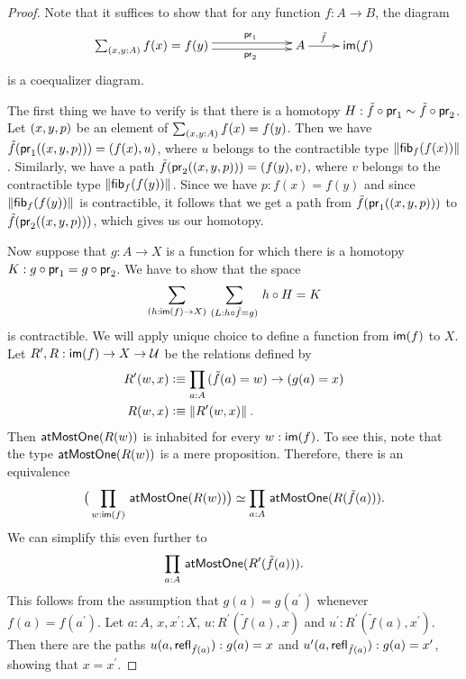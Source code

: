 \begin{proof}
Note that it suffices to show that for any function $f:A\to B$, the diagram
\begin{equation*}
  \xymatrix{
    **[l]{\sm{x,y:A} f(x)= f(y)}
    \ar@<0.25em>[r]^{\proj1}
    \ar@<-0.25em>[r]_{\proj2}
    &
    {A}
    \ar[r]^(0.4){\tilde{f}}
    &
    {\im(f)}
  }
\end{equation*}
is a coequalizer diagram.

The first thing we have to verify is that there is a homotopy 
$H:\tilde{f}\circ\mathsf{pr}_{1}\sim\tilde{f}\circ\mathsf{pr}_{2}$. Let ${(x,y,p)}$ be an element
of $\sm{x,y:A} f(x)= f(y)$. 
Then we have $\tilde{f}(\mathsf{pr}_{1}({(x,y,p)}))= {(f(x),u)}$, 
where $u$ belongs to the contractible type $\left\Vert {\mathsf{fib}}_{f}(f(x))\right\Vert_{}$. 
Similarly, we have a path 
$\tilde{f}(\mathsf{pr}_{2}({(x,y,p)}))= {(f(y),v)}$,
where $v$ belongs to the contractible type $\left\Vert {\mathsf{fib}}_{f}(f(y))\right\Vert_{}$.
Since we have $p:f(x)= f(y)$ and since
$\left\Vert {\mathsf{fib}}_{f}(f(y))\right\Vert_{}$ is contractible, 
it follows that we get a path from $\tilde{f}(\mathsf{pr}_{1}({(x,y,p)}))$ to
$\tilde{f}(\mathsf{pr}_{2}({(x,y,p)}))$, which gives us our homotopy.

Now suppose that $g:A\to X$ is a function for which there is a homotopy 
$K:g\circ\mathsf{pr}_{1} = g\circ\mathsf{pr}_{2}$. We have to show that the space
\begin{equation*}
\sm{h:\im(f)\to X}{L:h\circ\tilde{f} = g} h\circ H = K
\end{equation*}
is contractible. We will apply unique choice to define a 
function from $\mathsf{im}(f)$ to $X$. Let $R',R:\mathsf{im}(f)\to
X\to\mathcal{U}$ be the relations defined by 
\begin{align*}
R'(w,x) & \defeq\prd{a:A} (\tilde{f}(a)= w)\to (g(a)= x)\\
R(w,x) & \defeq \brck{R'(w,x)}.
\end{align*}
Then $\mathsf{atMostOne}(R(w))$ is inhabited for every $w:\mathsf{im}(f)$. 
To see this, note that the type $\mathsf{atMostOne}(R(w))$ is a
mere proposition. Therefore, there is an equivalence
\begin{equation*}
\big(\prd{w:\im(f)} \atMostOne(R(w))\big)
\simeq\prd{a:A} \atMostOne(R(\tilde{f}(a))).
\end{equation*}
We can simplify this even further to
\begin{equation*}
\prd{a:A} \atMostOne(R^\prime(\tilde{f}(a))).
\end{equation*}
This follows from the assumption that $g(a)= g(a^\prime)$ 
whenever $f(a)= f(a^\prime)$. Let $a:A$, $x,x^\prime:X$,
$u:R^\prime(\tilde{f}(a),x)$ and $u^\prime:R^\prime(\tilde{f}(a),x^\prime)$. 
Then there are the paths $u(a,\mathsf{refl}_{\tilde{f}(a)}):g(a)=
x$ and $u^\prime(a,\mathsf{refl}_{\tilde{f}(a)}):g(a)= x^\prime$, 
showing that $x= x^\prime$. 


\end{proof}
